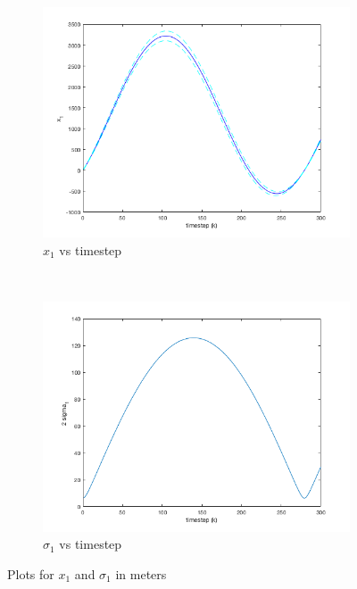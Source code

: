\documentclass[11pt]{article}
\begin{document}
\begin{figure}
\centering
\begin{subfigure}[b]{.45\textwidth}
	\centering
	\includegraphics[width=\textwidth]{p1_plt1.png}
	\caption{$x_1$ vs timestep}
	\label{x1}
\end{subfigure}
~
\begin{subfigure}[b]{.45\textwidth}
	\centering
	\includegraphics[width=\textwidth]{p1_plt2.png}
	\caption{$\sigma_1$ vs timestep}
	\label{sigma1}
\end{subfigure}
\caption{Plots for $x_1$ and $\sigma_1$ in meters}
\label{x1plots}
\end{figure}
\end{document}
